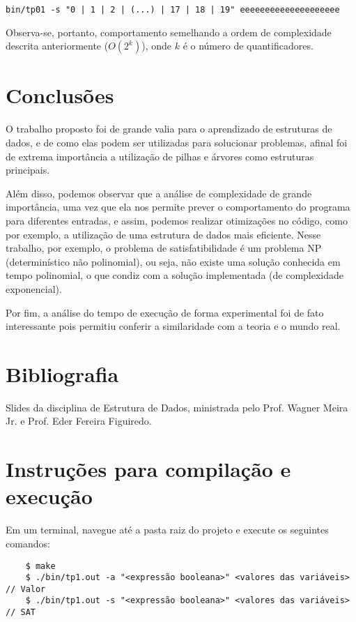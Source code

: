\documentclass{article}
\begin{document}
\verb#bin/tp01 -s "0 | 1 | 2 | (...) | 17 | 18 | 19" eeeeeeeeeeeeeeeeeeee#



Observa-se, portanto, comportamento semelhando a ordem de complexidade descrita anteriormente ($O(2^k)$), onde $k$ é o número de quantificadores.

\section{Conclusões}

O trabalho proposto foi de grande valia para o aprendizado de estruturas de dados, e de como elas podem ser utilizadas para solucionar problemas, afinal foi de extrema importância a utilização de pilhas e árvores como estruturas principais.  

Além disso, podemos observar que a análise de complexidade de grande importância, uma vez que ela nos permite prever o comportamento do programa para diferentes entradas, e assim, podemos realizar otimizações no código, como por exemplo, a utilização de uma estrutura de dados mais eficiente. Nesse trabalho, por exemplo, o problema de satisfatibilidade é um problema NP (determinístico não polinomial), ou seja, não existe uma solução conhecida em tempo polinomial, o que condiz com a solução implementada (de complexidade exponencial).

Por fim, a análise do tempo de execução de forma experimental foi de fato interessante pois permitiu conferir a similaridade com a teoria e o mundo real.
\section*{Bibliografia}

Slides da disciplina de Estrutura de Dados, ministrada pelo Prof. Wagner Meira Jr. e Prof. Eder Fereira Figuiredo.


\section*{Instruções para compilação e execução}

Em um terminal, navegue até a pasta raiz do projeto e execute os seguintes comandos:

\begin{verbatim}
    $ make
    $ ./bin/tp1.out -a "<expressão booleana>" <valores das variáveis> // Valor 
    $ ./bin/tp1.out -s "<expressão booleana>" <valores das variáveis> // SAT
\end{verbatim}
\end{document}
